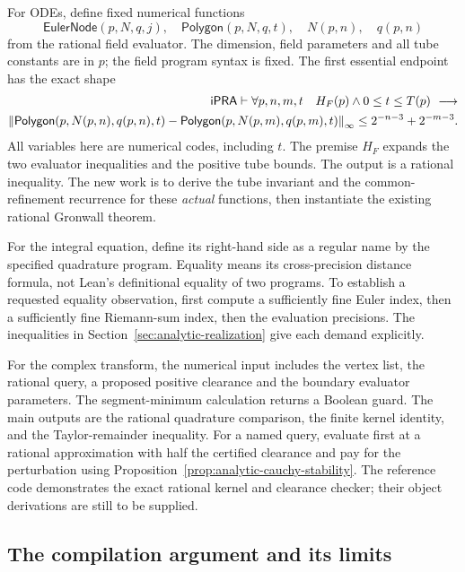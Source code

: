 For ODEs, define fixed numerical functions
\[
 \mathsf{EulerNode}(p,N,q,j),\quad
 \mathsf{Polygon}(p,N,q,t),\quad N(p,n),\quad q(p,n)
\]
from the rational field evaluator. The dimension, field parameters and all
tube constants are in $p$; the field program syntax is fixed. The first
essential endpoint has the exact shape
\begin{equation}\label{eq:ode-object-target}
\begin{split}
 \mathsf{iPRA}\vdash \forall p,n,m,t\quad
 H_F(p)\land 0\le t\le T(p)\ \longrightarrow\\
 \left\|\mathsf{Polygon}(p,N(p,n),q(p,n),t)
       -\mathsf{Polygon}(p,N(p,m),q(p,m),t)\right\|_\infty
       \le2^{-n-3}+2^{-m-3}.
\end{split}
\end{equation}
All variables here are numerical codes, including $t$. The premise $H_F$
expands the two evaluator inequalities and the positive tube bounds. The
output is a rational inequality. The new work is to derive the tube invariant
and the common-refinement recurrence for these \emph{actual} functions, then
instantiate the existing rational Gronwall theorem.

For the integral equation, define its right-hand side as a regular name by
the specified quadrature program. Equality means its cross-precision
distance formula, not Lean's definitional equality of two programs. To
establish a requested equality observation, first compute a sufficiently
fine Euler index, then a sufficiently fine Riemann-sum index, then the
evaluation precisions. The inequalities in
Section~\ref{sec:analytic-realization} give each demand explicitly.

For the complex transform, the numerical input includes the vertex list,
the rational query, a proposed positive clearance and the boundary evaluator
parameters. The segment-minimum calculation returns a Boolean guard. The
main outputs are the rational quadrature comparison, the finite kernel
identity, and the Taylor-remainder inequality. For a named query, evaluate
first at a rational approximation with half the certified clearance and pay
for the perturbation using Proposition~\ref{prop:analytic-cauchy-stability}.
The reference code demonstrates the exact rational kernel and clearance
checker; their object derivations are still to be supplied.

\subsection{The compilation argument and its limits}

